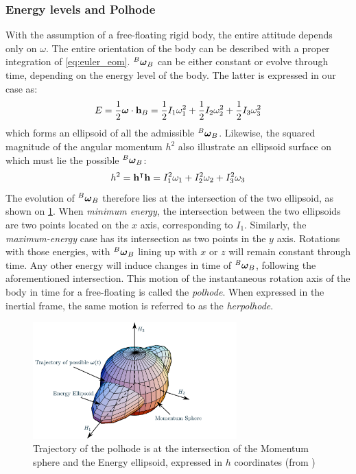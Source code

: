 \subsubsection{Energy levels and Polhode}
With the assumption of a free-floating rigid body, the entire attitude depends only on $\omega$. The entire orientation of the body can be described with a proper integration of \cref{eq:euler_eom}. ${}^{B}\boldsymbol{\mathbf{\omega}}_{B}$ can be either constant or evolve through time, depending on the energy level of the body. The latter is expressed in our case as:
\begin{equation}
	E = \frac{1}{2}\boldsymbol{\mathbf{\omega}} \cdot \boldsymbol{\mathbf{h}}_B = \frac{1}{2}I_1\omega^2_1 + \frac{1}{2}I_2\omega^2_2 + \frac{1}{2}I_3\omega^2_3
\end{equation} which forms an ellipsoid of all the admissible $^{B}\boldsymbol{\mathbf{\omega}}_{B}$. Likewise, the squared magnitude of the angular momentum $h^2$ also illustrate an ellipsoid surface on which must lie the possible $^{B}\boldsymbol{\mathbf{\omega}}_{B}$:
\begin{equation}
	h^2 = \boldsymbol{\mathbf{h}}^\intercal \boldsymbol{\mathbf{h}} = I_1^2\omega_1 + I_2^2\omega_2 + I_3^2\omega_3
\end{equation}
The evolution of $^{B}\boldsymbol{\mathbf{\omega}}_{B}$ therefore lies at the intersection of the two ellipsoid, as shown on \cref{fig:momentum_energy_sphere}. When \emph{minimum energy}, the intersection between the two ellipsoids are two points located on the $x$ axis, corresponding to $I_1$. Similarly, the \emph{maximum-energy} case has its intersection as two points in the $y$ axis. Rotations with those energies, with $^{B}\boldsymbol{\mathbf{\omega}}_{B}$ lining up with $x$ or $z$ will remain constant through time. Any other energy will induce changes in time of $^{B}\boldsymbol{\mathbf{\omega}}_{B}$, following the aforementioned intersection. This motion of the instantaneous rotation axis of the body in time for a free-floating is called the \emph{polhode}. When expressed in the inertial frame, the same motion is referred to as the \emph{herpolhode}.

\begin{figure}
	\centering
	\includegraphics[width=0.7\textwidth]{Figures/momentum_energy_sphere}
	\caption{Trajectory of the polhode is at the intersection of the Momentum sphere and the Energy ellipsoid, expressed in $h$ coordinates (from \cite{schaub_spacecraft_2020})}
	\label{fig:momentum_energy_sphere}
\end{figure}

